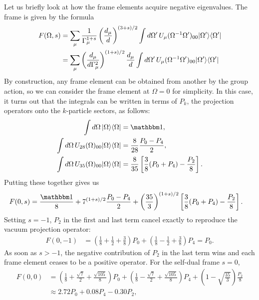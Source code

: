 Let us briefly look at how the frame elements acquire negative eigenvalues. The frame is given by the formula
\begin{align}
F(\Omega,s) &= \sum_{\mu} \frac{1}{\Gamma_{\mu}^{1+s}} \left( \frac{d_{\mu}}{d} \right)^{(3+s)/2}
\int d\Omega'\,U_{\mu}(\Omega^{-1}\Omega')_{00} {\left\vert{\Omega'}\right\rangle}{\left\langle{\Omega'}\right\vert} \\
	&= \sum_{\mu} \left( \frac{d_{\mu}}{d\Gamma_{\mu}^2} \right)^{(1+s)/2} \frac{d_{\mu}}{d}
	\int d\Omega'\,U_{\mu}(\Omega^{-1}\Omega')_{00} {\left\vert{\Omega'}\right\rangle}{\left\langle{\Omega'}\right\vert}
\end{align}
By construction, any frame element can be obtained from another by the group action, so we can consider the frame element at $\Omega = 0$ for simplicity. In this case, it turns out that the integrals can be written in terms of $P_k$, the projection operators onto the $k$-particle sectors, as follows:
\begin{align}
	\int d\Omega\,\ketbra{\Omega}{\Omega} &= \id, \\
	\int d\Omega\,\rep_{28}(\Omega)_{00} \ketbra{\Omega}{\Omega} &= \frac{8}{28}\frac{P_0 - P_4}{2}, \\
	\int d\Omega\,\rep_{35}(\Omega)_{00} \ketbra{\Omega}{\Omega} &= \frac{8}{35} \left[ \frac{3}{8}(P_0 + P_4) - \frac{P_2}{8} \right].
\end{align}
Putting these together gives us
\begin{align}
F(0,s) &=	\frac{\id}{8}
	+ 7^{(1+s)/2} \frac{P_0 - P_4}{2}
	+ \left( \frac{35}{3} \right)^{(1+s)/2} \left[ \frac{3}{8}(P_0 + P_4) - \frac{P_2}{8} \right].
\end{align}
Setting $s = -1$, $P_2$ in the first and last term cancel exactly to reproduce the vacuum projection operator:
\begin{align}
F(0,-1) &= \left( \frac{1}{8} + \frac{1}{2} + \frac{3}{8} \right) P_0 + \left( \frac{1}{8} - \frac{1}{2} + \frac{3}{8} \right) P_4 = P_0.
\end{align}
As soon as $s>-1$, the negative contribution of $P_2$ in the last term wins and each frame element ceases to be a positive operator. For the self-dual frame $s=0$,
\begin{align}
F(0,0) &= \left( \frac{1}{8} + \frac{\sqrt{7}}{2} + \frac{\sqrt{105}}{8} \right) P_0 +  \left( \frac{1}{8} - \frac{\sqrt{7}}{2} + \frac{\sqrt{105}}{8} \right) P_4 +  \left( 1 - \sqrt{\frac{35}{3}} \right) \frac{P_2}{8} \\
&\approx 2.72 P_0 + 0.08 P_4 - 0.30 P_2,
\end{align}

